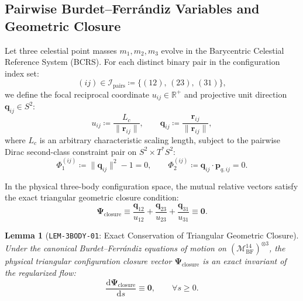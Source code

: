 \documentclass[11pt,a4paper,reqno]{article}
\theoremstyle{plain}
\newtheorem{lemma}[theorem]{Lemma}
\theoremstyle{definition}
\theoremstyle{remark}
\numberwithin{equation}{section}
\newcommand{\R}{\mathbb{R}}
\newcommand{\Mbf}{\mathcal{M}_{\mathrm{BF}}^{14}}
\providecommand{\diff}{\mathrm{d}}
\begin{document}
\subsection{Pairwise Burdet--Ferr\'andiz Variables and Geometric Closure}
\label{subsec:pairwise_bf_vars}
Let three celestial point masses $m_1, m_2, m_3$ evolve in the Barycentric Celestial Reference System (BCRS). For each distinct binary pair in the configuration index set:
\begin{equation}
  (ij) \in \mathcal{I}_{\mathrm{pairs}} \coloneqq \{(12),\, (23),\, (31)\},
  \label{eq:binary_pairs_set}
\end{equation}
we define the focal reciprocal coordinate $u_{ij} \in \R^+$ and projective unit direction $\mathbf{q}_{ij} \in S^2$:
\begin{equation}
  u_{ij} \coloneqq \frac{L_c}{\|\mathbf{r}_{ij}\|}, \qquad \mathbf{q}_{ij} \coloneqq \frac{\mathbf{r}_{ij}}{\|\mathbf{r}_{ij}\|},
  \label{eq:bf_focal_vars}
\end{equation}
where $L_c$ is an arbitrary characteristic scaling length, subject to the pairwise Dirac second-class constraint pair on $S^2 \times T^*S^2$:
\begin{equation}
  \Phi_1^{(ij)} \coloneqq \|\mathbf{q}_{ij}\|^2 - 1 = 0, \qquad \Phi_2^{(ij)} \coloneqq \mathbf{q}_{ij} \cdot \mathbf{p}_{q,ij} = 0.
  \label{eq:pairwise_dirac_constraints}
\end{equation}

In the physical three-body configuration space, the mutual relative vectors satisfy the exact triangular geometric closure condition:
\begin{equation}
  \bm{\Psi}_{\mathrm{closure}} \equiv \frac{\mathbf{q}_{12}}{u_{12}} + \frac{\mathbf{q}_{23}}{u_{23}} + \frac{\mathbf{q}_{31}}{u_{31}} \equiv \mathbf{0}.
  \label{eq:triangular_closure}
\end{equation}

\begin{lemma}[\texttt{LEM-3BODY-01}: Exact Conservation of Triangular Geometric Closure]
\label{lem:closure_conservation}
Under the canonical Burdet--Ferr\'andiz equations of motion on $(\Mbf)^{\otimes 3}$, the physical triangular configuration closure vector $\bm{\Psi}_{\mathrm{closure}}$ is an exact invariant of the regularized flow:
\begin{equation}
  \frac{\diff \bm{\Psi}_{\mathrm{closure}}}{\diff s} \equiv \mathbf{0}, \qquad \forall s \ge 0.
\end{equation}
\end{lemma}
\end{document}
